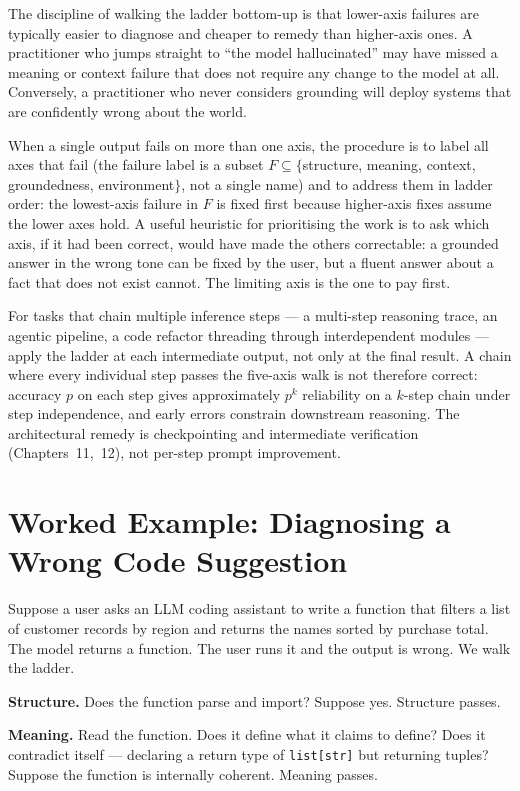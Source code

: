 The discipline of walking the ladder bottom-up is that lower-axis
failures are typically easier to diagnose and cheaper to remedy
than higher-axis ones. A practitioner who jumps straight to ``the
model hallucinated'' may have missed a meaning or context failure
that does not require any change to the model at all. Conversely,
a practitioner who never considers grounding will deploy systems
that are confidently wrong about the world.

When a single output fails on more than one axis, the procedure
is to label all axes that fail (the failure label is a subset
$F \subseteq \{$structure, meaning, context, groundedness,
environment$\}$, not a single name) and to address them in
ladder order: the lowest-axis failure in $F$ is fixed first
because higher-axis fixes assume the lower axes hold. A useful
heuristic for prioritising the work is to ask which axis, if it
had been correct, would have made the others correctable: a
grounded answer in the wrong tone can be fixed by the user, but
a fluent answer about a fact that does not exist cannot. The
limiting axis is the one to pay first.

For tasks that chain multiple inference steps --- a multi-step
reasoning trace, an agentic pipeline, a code refactor threading
through interdependent modules --- apply the ladder at each
intermediate output, not only at the final result. A chain where
every individual step passes the five-axis walk is not therefore
correct: accuracy $p$ on each step gives approximately $p^k$
reliability on a $k$-step chain under step independence, and
early errors constrain downstream reasoning. The architectural
remedy is checkpointing and intermediate verification
(Chapters~11,~12), not per-step prompt improvement.

\section{Worked Example: Diagnosing a Wrong Code Suggestion}

Suppose a user asks an LLM coding assistant to write a function
that filters a list of customer records by region and returns the
names sorted by purchase total. The model returns a function. The
user runs it and the output is wrong. We walk the ladder.

\textbf{Structure.} Does the function parse and import? Suppose
yes. Structure passes.

\textbf{Meaning.} Read the function. Does it define what it claims
to define? Does it contradict itself --- declaring a return type
of \texttt{list[str]} but returning tuples? Suppose the function
is internally coherent. Meaning passes.

